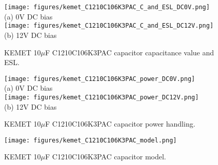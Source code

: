 \documentclass[10pt,twoside]{article}
\begin{document}
\begin{figure}[p]
  \begin{center}
    \texttt{[image: figures/kemet\_C1210C106K3PAC\_C\_and\_ESL\_DC0V.png]}\\
    (a) 0V DC bias\\
    $\quad$\\
    \texttt{[image: figures/kemet\_C1210C106K3PAC\_C\_and\_ESL\_DC12V.png]}\\
    (b) 12V DC bias\\
  \end{center}
  \caption{KEMET 10$\mu$F C1210C106K3PAC capacitor capacitance value and ESL.}
  \label{fig:kemet_C_and_ESL}
\end{figure}

\begin{figure}[p]
  \begin{center}
    \texttt{[image: figures/kemet\_C1210C106K3PAC\_power\_DC0V.png]}\\
    (a) 0V DC bias\\
    $\quad$\\
    \texttt{[image: figures/kemet\_C1210C106K3PAC\_power\_DC12V.png]}\\
    (b) 12V DC bias\\
  \end{center}
  \caption{KEMET 10$\mu$F C1210C106K3PAC capacitor power handling.}
  \label{fig:kemet_power}
\end{figure}

\begin{figure}[p]
  \begin{center}
    \texttt{[image: figures/kemet\_C1210C106K3PAC\_model.png]}\\
  \end{center}
  \caption{KEMET 10$\mu$F C1210C106K3PAC capacitor model.}
  \label{fig:kemet_model}
\end{figure}

\end{document}
